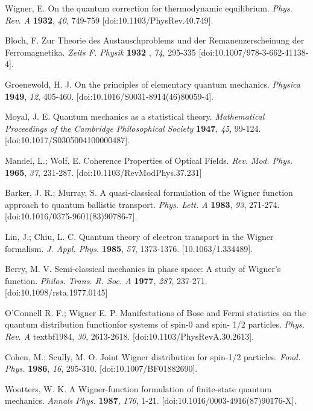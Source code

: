 \documentclass{article}
\begin{document}
\begin{thebibliography}{99}
 Wigner, E. On the quantum correction for thermodynamic
equilibrium. \textit{Phys. Rev. A} \textbf{1932}, \textit{40}, 749-759
[doi:10.1103/PhysRev.40.749].

 Bloch, F. Zur Theorie des Austauschproblems und der
Remanenzerscheinung der Ferromagnetika. \textit{Zeits F. Physik} \textbf{1932%
}, \textit{74}, 295-335 [doi:10.1007/978-3-662-41138-4].

 Groenewold, H. J. On the principles of elementary
quantum mechanics. \textit{Physica} \textbf{1949}, \textit{12}, 405-460.
[doi:10.1016/S0031-8914(46)80059-4].

 Moyal, J. E. Quantum mechanics as a statistical theory. 
\textit{Mathematical Proceedings of the Cambridge Philosophical Society} 
\textbf{1947}, \textit{45}, 99-124. [doi:10.1017/S0305004100000487].

 Mandel, L.; Wolf, E. Coherence Properties of Optical
Fields. \textit{Rev. Mod. Phys.} \textbf{1965}, \textit{37}, 231-287.
[doi:10.1103/RevModPhys.37.231]

 Barker, J. R.; Murray, S. A quasi-classical formulation
of the Wigner function approach to quantum ballistic transport. \textit{%
Phys. Lett. A} \textbf{1983}, \textit{93}, 271-274.
[doi:10.1016/0375-9601(83)90786-7].

 Lin, J.; Chiu, L. C. Quantum theory of electron
transport in the Wigner formalism. \textit{J. Appl. Phys.} \textbf{1985}, 
\textit{57}, 1373-1376. [10.1063/1.334489].

 Berry, M. V. Semi-classical mechanics in phase space: A
study of Wigner's function. \textit{Philos. Trans. R. Soc. A} \textbf{1977}, 
\textit{287}, 237-271. [doi:10.1098/rsta.1977.0145]

 O'Connell R. F.; Wigner E. P. Manifestations of Bose and
Fermi statistics on the quantum distribution functionfor systems of spin-0
and spin- 1/2 particles. \textit{Phys. Rev. A} textbf{1984}, \textit{30},
2613-2618. [doi:10.1103/PhysRevA.30.2613].

 Cohen, M.; Scully, M. O. Joint Wigner distribution for
spin-1/2 particles. \textit{Foud. Phys.} \textbf{1986}, \textit{16},
295-310. [doi:10.1007/BF01882690].

 Wootters, W. K. A Wigner-function formulation of
finite-state quantum mechanics. \textit{Annals Phys.} \textbf{1987}, \textit{%
176}, 1-21. [doi:10.1016/0003-4916(87)90176-X].


\end{thebibliography}
\end{document}

